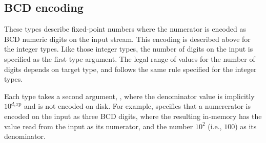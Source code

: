 \subsection{BCD encoding}

\bcdBegin{}
\bcdEnd{}

These types describe fixed-point numbers where the numerator is
encoded as BCD numeric digits on the input stream.  This encoding
is described above for the  integer types.  Like those
integer types, the number of digits on the input is specified as the first
type argument.  The legal range of values for the number of
digits depends on target type, and follows the same rule specified for
the  integer types.

Each type takes a second argument,
, where the denominator value
is implicitly $10^{d_exp}$ and is not encoded on disk.  For example,
 specifies that a numererator is encoded on the
input as three BCD digits, where the resulting in-memory
 has the value read from the input as its numerator, and
the number $10^2$ (i.e., $100$) as its denominator.

